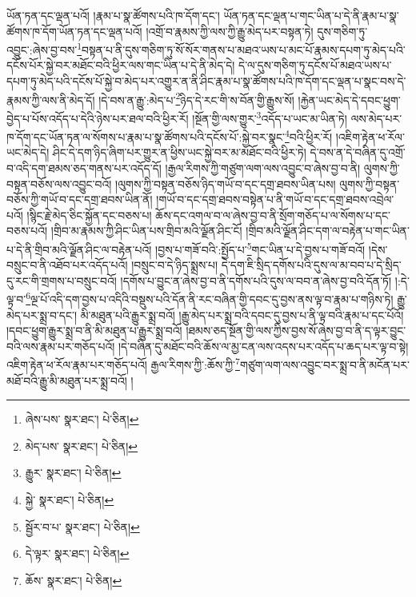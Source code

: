 ཡོན་ཏན་དང་ལྡན་པའོ། །རྣམ་པ་སྣ་ཚོགས་པའི་ཁ་དོག་དང་། ཡོན་ཏན་དང་ལྡན་པ་གང་ཡིན་པ་དེ་ནི་རྣམ་པ་སྣ་ཚོགས་ཁ་དོག་ཡོན་ཏན་དང་ལྡན་པའོ། །འགྲོ་བ་རྣམས་ཀྱི་ལས་ཀྱི་རྒྱུ་མེད་པར་བསྟན་ཏེ། དུས་གཅིག་ཏུ་འབྱུང་:ཞེས་བྱ་བས་\footnote{ཞེས་པས་  སྣར་ཐང་།  པེ་ཅིན། }བསྟན་པ་ནི་དུས་གཅིག་ཏུ་སོ་སོར་གནས་པ་མཐའ་ཡས་པ་མང་པོ་རྣམས་དཔག་ཏུ་མེད་པའི་དངོས་པོར་སྐྱེ་བར་མཐོང་བའི་ཕྱིར་ལས་གང་ཡིན་པ་དེ་ནི་མེད་དེ། དེ་ལ་དུས་གཅིག་ཏུ་དངོས་པོ་མཐའ་ཡས་པ་དཔག་ཏུ་མེད་པའི་དངོས་པོ་སྐྱེ་བ་མེད་པར་འགྱུར་ན་ནི་ཤིང་རྣམ་པ་སྣ་ཚོགས་པའི་ཁ་དོག་དང་ལྡན་པ་སྣང་བས་དེ་རྣམས་ཀྱི་ལས་ནི་མེད་དོ། །དེ་བས་ན་རྒྱུ་:མེད་པ་\footnote{མེད་པས་  སྣར་ཐང་།  པེ་ཅིན། }ཉིད་དེ་རང་གི་ས་བོན་གྱི་རྒྱུས་སོ། །རྐྱེན་ཡང་མེད་དེ་དབང་ཕྱུག་བྱེད་པ་པོས་འདོད་པ་དེའི་ཉེས་པར་ཐལ་བའི་ཕྱིར་རོ། །སྔོན་གྱི་ལས་གྱུར་\footnote{རྒྱུར་  སྣར་ཐང་།  པེ་ཅིན། }འདོད་པ་ཡང་མ་ཡིན་ཏེ། ལས་མེད་པར་ཁ་དོག་དང་ཡོན་ཏན་ལ་སོགས་པ་རྣམ་པ་སྣ་ཚོགས་པའི་དངོས་པོ་:སྐྱེ་བར་སྣང་\footnote{སྐྱེ་  སྣར་ཐང་།  པེ་ཅིན། }བའི་ཕྱིར་རོ། །འཇིག་རྟེན་ཕ་རོལ་ཡང་མེད་དེ། ཤིང་དེ་དག་ཉིད་ཞིག་པར་གྱུར་ན་ཕྱིས་ཡང་སྐྱེ་བར་མ་མཐོང་བའི་ཕྱིར་ཏེ། དེ་བས་ན་དེ་བཞིན་དུ་འགྲོ་བ་འདི་དག་ཐམས་ཅད་གནས་པར་འདོད་དོ། །རྒྱལ་རིགས་ཀྱི་གཙུག་ལག་ལས་འབྱུང་བ་ཞེས་བྱ་བ་ནི། ལུགས་ཀྱི་བསྟན་བཅོས་ལས་འབྱུང་བའོ། །ལུགས་ཀྱི་བསྟན་བཅོས་ཉིད་གཡོ་བ་དང་དགྲ་ཐབས་ཡིན་པས། ལུགས་ཀྱི་བསྟན་བཅོས་ཀྱི་གཡོ་བ་དང་དགྲ་ཐབས་ཡིན་ནོ། །གཡོ་བ་དང་དགྲ་ཐབས་བསྟེན་པ་ནི་གཡོ་བ་དང་དགྲ་ཐབས་འབྲེལ་པའོ། །སྙིང་རྗེ་མེད་ཅིང་སྐྱོན་དང་བཅས་པ། ཆོས་དང་འགལ་བ་ལ་ཞེས་བྱ་བ་ནི་སྲོག་གཅོད་པ་ལ་སོགས་པ་དང་བཅས་པའོ། །གྲིབ་མ་རྣམས་ཀྱི་ཤིང་ཡིན་པས་གྲིབ་མའི་ལྗོན་ཤིང་ངོ། །གྲིབ་མའི་ལྗོན་ཤིང་དག་ལ་བརྟེན་པ་གང་ཡིན་པ་དེ་ནི་གྲིབ་མའི་ལྗོན་ཤིང་ལ་བརྟེན་པའོ། །བྱས་པ་གཟོ་བའི་:སྤྱོད་པ་\footnote{སྦྱོར་བ་པ་  སྣར་ཐང་།  པེ་ཅིན། }གང་ཡིན་པ་དེ་བྱས་པ་གཟོ་བའོ། །དེས་བསྲུང་བ་ནི་འཐོབ་པར་འདོད་པའོ། །བསྲུང་བ་དེ་ཉིད་སྨྲས་པ། དེ་དག་ཇི་སྲིད་དགོས་པའི་དུས་ལ་མ་བབ་པ་དེ་སྲིད་དུ་རང་གི་གྲགས་པ་བསྲུང་བའོ། །དགོས་པ་བྱུང་ན་ཞེས་བྱ་བ་ནི་དགོས་པའི་དུས་ལ་བབ་ན་ཞེས་བྱ་བའི་དོན་ཏོ། །:དེ་ལྟ་བ་\footnote{དེ་ལྟར་  སྣར་ཐང་།  པེ་ཅིན། }ལྔ་པོ་འདི་དག་བྱས་པ་འདིའི་བསྡུས་པའི་དོན་ནི་རང་བཞིན་གྱི་དབང་དུ་བྱས་ནས་ལྟ་བ་རྣམ་པ་གཉིས་ཏེ། རྒྱུ་མེད་པར་སྨྲ་བ་དང་། མི་མཐུན་པའི་རྒྱུར་སྨྲ་བའོ། །རྒྱུ་མེད་པར་སྨྲ་བའི་དབང་དུ་བྱས་པ་ནི་ལྟ་བའི་རྣམ་པ་དང་པོའོ། །དབང་ཕྱུག་རྒྱུར་སྨྲ་བ་ནི་མི་མཐུན་པ་རྒྱུར་སྨྲ་བའོ། །ཐམས་ཅད་སྔོན་གྱི་ལས་ཀྱིས་བྱས་སོ་ཞེས་བྱ་བ་ནི་ད་ལྟར་བྱུང་བའི་ལས་རྣམ་པར་གཅོད་པའོ། །དེ་བཞིན་དུ་མཐོང་བའི་ཆོས་ལ་མྱ་ངན་ལས་འདས་པར་འདོད་པ་ཆད་པར་ལྟ་བ་སྟེ། འཇིག་རྟེན་ཕ་རོལ་རྣམ་པར་གཅོད་པའོ། རྒྱལ་རིགས་ཀྱི་:ཆོས་ཀྱི་\footnote{ཆོས་  སྣར་ཐང་།  པེ་ཅིན། }གཙུག་ལག་ལས་འབྱུང་བར་སྨྲ་བ་ནི་མངོན་པར་མཐོ་བའི་རྒྱུ་མི་མཐུན་པར་སྨྲ་བའོ། །
